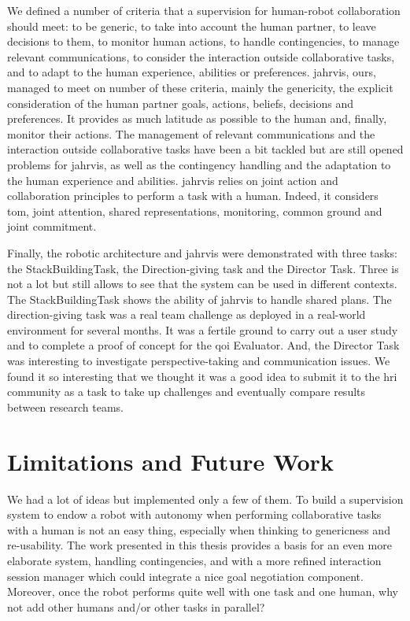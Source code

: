 \documentclass[a4paper,11pt,twoside]{StyleThese}
\begin{document}
We defined a number of criteria that a supervision for human-robot collaboration should meet: to be generic, to take into account the human partner, to leave decisions to them, to monitor human actions, to handle contingencies, to manage relevant communications, to consider the interaction outside collaborative tasks, and to adapt to the human experience, abilities or preferences. \acrfull{jahrvis}, ours, managed to meet on number of these criteria, mainly the genericity, the explicit consideration of the human partner goals, actions, beliefs, decisions and preferences. It provides as much latitude as possible to the human and, finally, monitor their actions. The management of relevant communications and the interaction outside collaborative tasks have been a bit tackled but are still opened problems for \acrshort{jahrvis}, as well as the contingency handling and the adaptation to the human experience and abilities. \acrshort{jahrvis} relies on joint action and collaboration principles to perform a task with a human. Indeed, it considers \acrlong{tom}, joint attention, shared representations, monitoring, common ground and joint commitment.

Finally, the robotic architecture and \acrshort{jahrvis} were demonstrated with three tasks: the StackBuildingTask, the Direction-giving task and the Director Task. Three is not a lot but still allows to see that the system can be used in different contexts. The StackBuildingTask shows the ability of \acrshort{jahrvis} to handle shared plans. The direction-giving task was a real team challenge as deployed in a real-world environment for several months. It was a fertile ground to carry out a user study and to complete a proof of concept for the \acrshort{qoi} Evaluator. And, the Director Task was interesting to investigate perspective-taking and communication issues. We found it so interesting that we thought it was a good idea to submit it to the \acrshort{hri} community as a task to take up challenges and eventually compare results between research teams.



\section*{Limitations and Future Work}

We had a lot of ideas but implemented only a few of them. To build a supervision system to endow a robot with autonomy when performing collaborative tasks with a human is not an easy thing, especially when thinking to genericness and re-usability. The work presented in this thesis provides a basis for an even more elaborate system, handling contingencies, and with a more refined interaction session manager which could integrate a nice goal negotiation component. Moreover, once the robot performs quite well with one task and one human, why not add other humans and/or other tasks in parallel?
\end{document}
